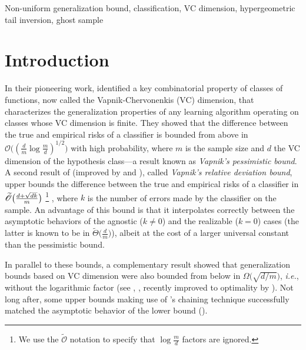 \documentclass[twoside,11pt]{article}
\renewcommand{\O}{\mathscr{O}}
\newcommand{\Otilde}{\widetilde{\mathscr{O}}}
\newcommand{\ie}{\emph{i.e.\xspace}}
\newcommand{\pr}[1]{\left(#1\right)}
\begin{document}
\begin{keywords} %
  Non-uniform generalization bound, classification, VC dimension, hypergeometric tail inversion, ghost sample
\end{keywords}

\section{Introduction}


In their pioneering work, \citet{vapnik71} identified a key combinatorial property of classes of functions, now called the Vapnik-Chervonenkis (VC) dimension, that characterizes the generalization properties of any learning algorithm operating on classes whose VC dimension is finite.
They showed that the difference between the true and empirical risks of a classifier is bounded from above in $\O\big(\!\pr{\frac{d}{m} \log \frac{m}{d}}^{\scriptscriptstyle 1/2}\big)$
with high probability, where $m$ is the sample size and $d$ the VC dimension of the hypothesis class---a result known as \emph{Vapnik's pessimistic bound}.
A second result of \citet{vapnik71} (improved by \citet{as-93} and \citet{vapnik98}), called \emph{Vapnik's relative deviation bound}, upper bounds the difference between the true and empirical risks of a classifier in $\smash[t]{\Otilde\big(\frac{d+\sqrt{dk}}{m}\big)}$%
\footnote{We use the $\Otilde$ notation to specify that $\log\frac{m}{d}$ factors are ignored.}%
, where $k$ is the number of errors made by the classifier on the sample.
An advantage of this bound is that it interpolates correctly between the asymptotic behaviors of the agnostic ($k\ne 0$) and the realizable ($k=0$) cases (the latter is known to be in $\widetilde{\Theta}\big(\frac{d}{m}\big)$), albeit at the cost of a larger universal constant than the pessimistic bound.

In parallel to these bounds, a complementary result showed that generalization bounds based on VC dimension were also bounded from below in $\Omega\big(\sqrt{d/m}\big)$, \ie, without the logarithmic factor (see \citet{vapnik98}, \citet{as-93}, recently improved to optimality by \citet{kontorovich2019exact}).
Not long after, some upper bounds making use of \citet{dudley1978central}'s chaining technique successfully matched the asymptotic behavior of the lower bound (\citet{li2001improved,lugosi2002pattern}).
\end{document}
